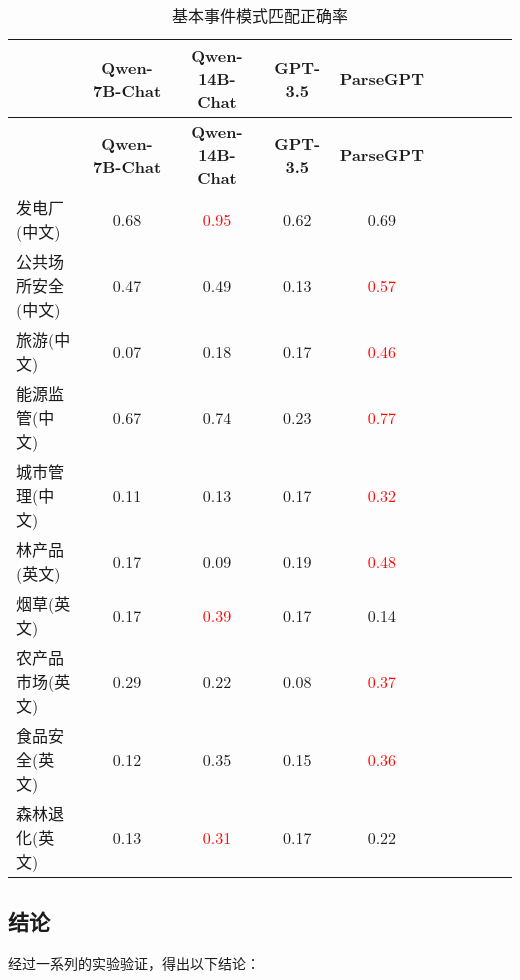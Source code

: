 \begin{longtable}{@{}lccccccccc@{}}
    \caption{基本事件模式匹配正确率} \label{tab:333} \\
    \toprule
     & \textbf{Qwen-7B-Chat} & \textbf{Qwen-14B-Chat} & \textbf{GPT-3.5} & \textbf{ParseGPT} \\ 
    \midrule
    \endfirsthead
    
    \toprule
     & \textbf{Qwen-7B-Chat} & \textbf{Qwen-14B-Chat} & \textbf{GPT-3.5} & \textbf{ParseGPT} \\ 
    \midrule
    \endhead
    
    \midrule
    \endfoot
    
    \bottomrule
    \endlastfoot
    
    发电厂(中文) & 0.68 & \textcolor{red}{0.95} & 0.62 & 0.69 \\
    公共场所安全(中文) & 0.47 & 0.49 & 0.13 & \textcolor{red}{0.57} \\
    旅游(中文) & 0.07 & 0.18 & 0.17 & \textcolor{red}{0.46} \\
    能源监管(中文) & 0.67 & 0.74 & 0.23 & \textcolor{red}{0.77} \\
    城市管理(中文) & 0.11 & 0.13 & 0.17 & \textcolor{red}{0.32} \\
    林产品(英文) & 0.17 & 0.09 & 0.19 & \textcolor{red}{0.48} \\
    烟草(英文) & 0.17 & \textcolor{red}{0.39} & 0.17 & 0.14 \\
    农产品市场(英文) & 0.29 & 0.22 & 0.08 & \textcolor{red}{0.37} \\
    食品安全(英文) & 0.12 & 0.35 & 0.15 & \textcolor{red}{0.36} \\
    森林退化(英文) & 0.13 & \textcolor{red}{0.31} & 0.17 & 0.22 \\
    
\end{longtable}

\subsection{结论}

经过一系列的实验验证，得出以下结论：

